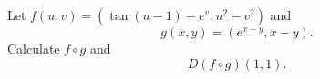 \documentclass[openany]{book}
\begin{document}
\begin{prob}[2.5, Q7]
    Let \( f(u, v) = (\tan (u - 1) - e^v, u^2 - v^2) \) and  
   \[
   g(x, y) = (e^{x-y}, x - y).
   \]  
   Calculate \( f \circ g \) and  
   \[
   D(f \circ g)(1, 1).
   \]
\end{prob}
\end{document}
